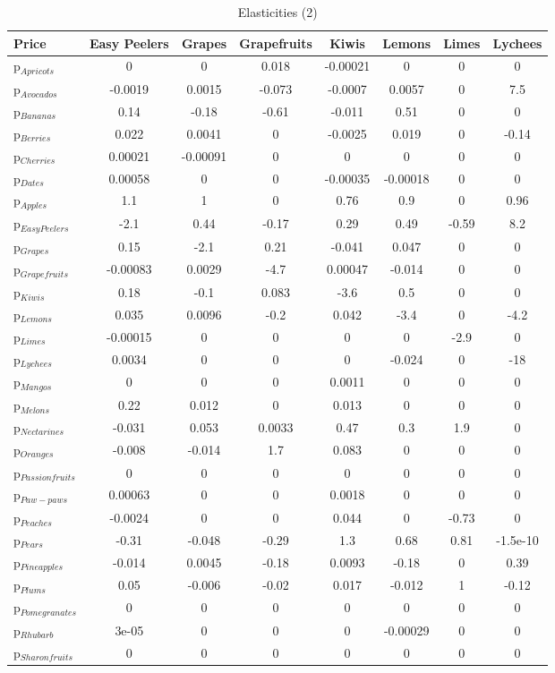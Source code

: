 \documentclass[11pt]{article}
\begin{document}
\begin{table}[h]
\caption{Elasticities (2)}
\label{table:elasticities 2}
\begin{center}
\begin{tabular}{lccccccc} \hline \hline
Price &Easy Peelers &Grapes &Grapefruits &Kiwis &Lemons &Limes &Lychees \\ \hline
p$_{Apricots}$ &0 &0 &0.018 &-0.00021 &0 &0 &0 \\
p$_{Avocados}$ &-0.0019 &0.0015 &-0.073 &-0.0007 &0.0057 &0 &7.5 \\
p$_{Bananas}$ &0.14 &-0.18 &-0.61 &-0.011 &0.51 &0 &0 \\
p$_{Berries}$ &0.022 &0.0041 &0 &-0.0025 &0.019 &0 &-0.14 \\
p$_{Cherries}$ &0.00021 &-0.00091 &0 &0 &0 &0 &0 \\
p$_{Dates}$ &0.00058 &0 &0 &-0.00035 &-0.00018 &0 &0 \\
p$_{Apples}$ &1.1 &1 &0 &0.76 &0.9 &0 &0.96 \\
p$_{Easy Peelers}$ &-2.1 &0.44 &-0.17 &0.29 &0.49 &-0.59 &8.2 \\
p$_{Grapes}$ &0.15 &-2.1 &0.21 &-0.041 &0.047 &0 &0 \\
p$_{Grapefruits}$ &-0.00083 &0.0029 &-4.7 &0.00047 &-0.014 &0 &0 \\
p$_{Kiwis}$ &0.18 &-0.1 &0.083 &-3.6 &0.5 &0 &0 \\
p$_{Lemons}$ &0.035 &0.0096 &-0.2 &0.042 &-3.4 &0 &-4.2 \\
p$_{Limes}$ &-0.00015 &0 &0 &0 &0 &-2.9 &0 \\
p$_{Lychees}$ &0.0034 &0 &0 &0 &-0.024 &0 &-18 \\
p$_{Mangos}$ &0 &0 &0 &0.0011 &0 &0 &0 \\
p$_{Melons}$ &0.22 &0.012 &0 &0.013 &0 &0 &0 \\
p$_{Nectarines}$ &-0.031 &0.053 &0.0033 &0.47 &0.3 &1.9 &0 \\
p$_{Oranges}$ &-0.008 &-0.014 &1.7 &0.083 &0 &0 &0 \\
p$_{Passion fruits}$ &0 &0 &0 &0 &0 &0 &0 \\
p$_{Paw-paws}$ &0.00063 &0 &0 &0.0018 &0 &0 &0 \\
p$_{Peaches}$ &-0.0024 &0 &0 &0.044 &0 &-0.73 &0 \\
p$_{Pears}$ &-0.31 &-0.048 &-0.29 &1.3 &0.68 &0.81 &-1.5e-10 \\
p$_{Pineapples}$ &-0.014 &0.0045 &-0.18 &0.0093 &-0.18 &0 &0.39 \\
p$_{Plums}$ &0.05 &-0.006 &-0.02 &0.017 &-0.012 &1 &-0.12 \\
p$_{Pomegranates}$ &0 &0 &0 &0 &0 &0 &0 \\
p$_{Rhubarb}$ &3e-05 &0 &0 &0 &-0.00029 &0 &0 \\
p$_{Sharon fruits}$ &0 &0 &0 &0 &0 &0 &0 \\
\end{tabular}
\end{center}
\end{table}
\end{document}
